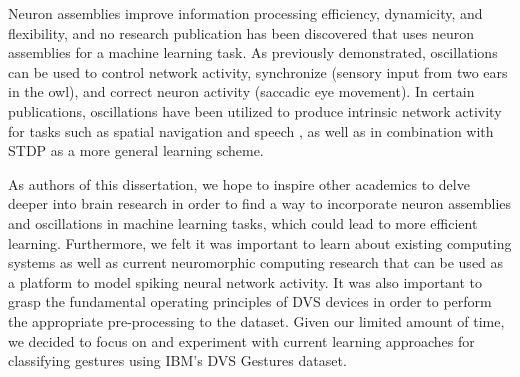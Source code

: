 \documentclass[12pt]{report}
\begin{document}
Neuron assemblies improve information processing efficiency, dynamicity, and flexibility, and no research publication has been discovered that uses neuron assemblies for a machine learning task. As previously demonstrated, oscillations can be used to control network activity, synchronize (sensory input from two ears in the owl), and correct neuron activity (saccadic eye movement). In certain publications, oscillations have been utilized to produce intrinsic network activity for tasks such as spatial navigation and speech \cite{vincent2020}, as well as in combination with STDP \cite{deco2009} as a more general learning scheme.

As authors of this dissertation, we hope to inspire other academics to delve deeper into brain research in order to find a way to incorporate neuron assemblies and oscillations in machine learning tasks, which could lead to more efficient learning. Furthermore, we felt it was important to learn about existing computing systems as well as current neuromorphic computing research that can be used as a platform to model spiking neural network activity. It was also important to grasp the fundamental operating principles of DVS devices in order to perform the appropriate pre-processing to the dataset. Given our limited amount of time, we decided to focus on and experiment with current learning approaches for classifying gestures using IBM's DVS Gestures dataset.


\end{document}
